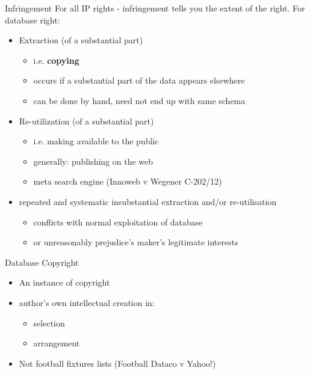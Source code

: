 \documentclass{beamer}
\begin{document}
\begin{frame}{Infringement}
For all IP rights - infringement tells you the extent of the right. For database right:
  \begin{itemize}
  \item Extraction (of a substantial part)
    \begin{itemize}
    \item i.e. {\bf copying}
    \item occurs if a substantial part of the data appears elsewhere
    \item can be done by hand, need not end up with same schema
    \end{itemize}
  \item Re-utilization (of a substantial part)
    \begin{itemize}
    \item i.e. making available to the public
    \item generally: publishing on the web
    \item meta search engine (Innoweb v Wegener C-202/12)
    \end{itemize}
  \item repeated and systematic insubstantial extraction and/or re-utilisation
    \begin{itemize}
    \item conflicts with normal exploitation of database
    \item or unreasonably prejudice's maker's legitimate interests
    \end{itemize}
  \end{itemize}
\end{frame}

\begin{frame}{Database Copyright}
  \begin{itemize}
  \item An instance of copyright
  \item author's own intellectual creation in:
    \begin{itemize}
    \item selection
    \item arrangement
    \end{itemize}
  \item Not football fixtures lists (Football Dataco v Yahoo!)
  \end{itemize}
\end{frame}
\end{document}
